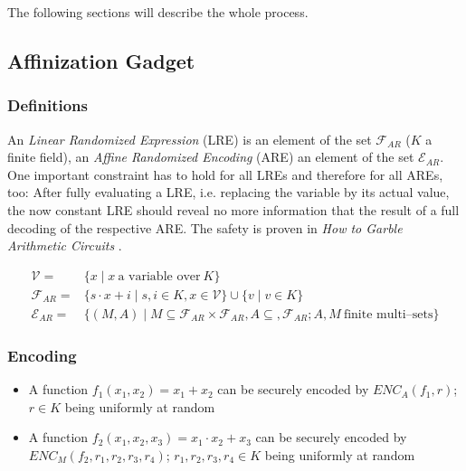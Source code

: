 \documentclass[12pt, a4paper]{article}
\begin{document}
\noindent{}The following sections will describe the whole process.


\subsection{Affinization Gadget}
\label{sec:affinization-gadget}

\subsubsection{Definitions}
\label{sec:affinization_definitions}

An \emph{Linear Randomized Expression} (LRE) is an element of the set
$\mathcal{F}_{AR}$ ($K$ a finite field), an \emph{Affine Randomized Encoding}
(ARE) an element of the set $\mathcal{E}_{AR}$. One important constraint has to
hold for all LREs and therefore for all AREs, too: After fully evaluating a LRE,
i.e. replacing the variable by its actual value, the now constant LRE should
reveal no more information that the result of a full decoding of the respective
ARE. The safety is proven in \emph{How to Garble Arithmetic Circuits}
\cite{gac2012}.

\begin{align*}
  \mathcal{V} = & \{ x \mid x~\text{a variable over}~K \} \\
%
  \mathcal{F}_{AR} = & \{ s \cdot x + i \mid s, i \in K, x \in \mathcal{V} \}
  \cup \{ v \mid v \in K \} \\
%
  \mathcal{E}_{AR} = & \{ (M, A) \mid
    M \subseteq \mathcal{F}_{AR} \times \mathcal{F}_{AR},
    A \subseteq, \mathcal{F}_{AR};
    A, M~\text{finite multi--sets} \}
%
\end{align*}


\subsubsection{Encoding}
\label{sec:affinization_encoding}

\begin{itemize}

\item A function $f_1(x_1, x_2) = x_1 + x_2$ can be securely encoded by
$ENC_A(f_1, r)$; $r \in K$ being uniformly at random

\item A function $f_2(x_1, x_2, x_3) = x_1 \cdot x_2 + x_3$ can be securely
encoded by $ENC_M(f_2, r_1, r_2, r_3, r_4)$; $r_1, r_2, r_3, r_4 \in K$ being
uniformly at random
\end{itemize}
\end{document}

